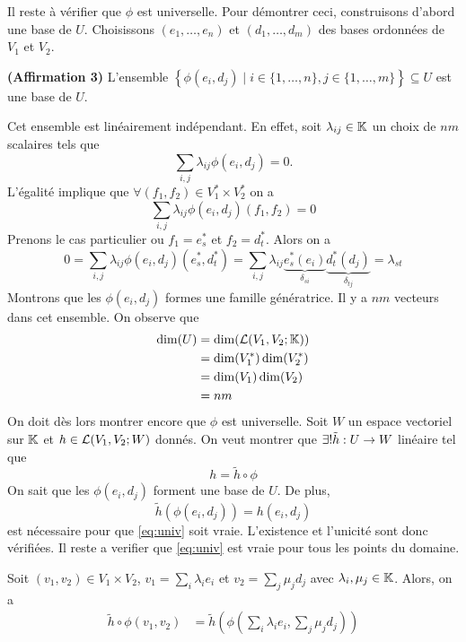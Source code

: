 \begin{theoreme}
\begin{preuve}
    Il reste à vérifier que $\phi$ est universelle. Pour démontrer ceci, construisons d'abord une base de $U$. Choisissons  $(e_1, \dots, e_n)$ et $(d_1, \dots, d_m)$ des bases ordonnées de $V_1$ et $V_2$.
    \par \textbf{(Affirmation 3)} L'ensemble $\left\{ \phi(e_i, d_j) \mid i \in \{1, \dots, n \}, j\in \{ 1, \dots, m\} \right\} \subseteq U$ est une base de $U$.
    \par Cet ensemble est linéairement indépendant. En effet, soit $\lambda_{ij} \in \mathbb{K}$ un choix de $nm$ scalaires tels que $$\sum_{i,j} \lambda_{ij} \phi(e_i, d_j) = 0.$$
    L'égalité implique que $\forall (f_1,f_2) \in V_1^* \times V_2^*$ on a
    $$\sum_{i,j} \lambda_{ij} \phi(e_i, d_j)(f_1,f_2) = 0$$
    Prenons le cas particulier ou $f_1 = e^*_s$ et $f_2 = d^*_t$. Alors on a
    $$0 = \sum_{i,j} \lambda_{ij} \phi(e_i, d_j)(e^*_s, d^*_t) = \sum_{i,j} \lambda_{ij} \underbrace{e^*_s(e_i)}_{\delta_{si}}\underbrace{d^*_t(d_j)}_{\delta_{tj}} = \lambda_{st}$$
    Montrons que les $\phi(e_i, d_j)$ formes une famille génératrice. Il y a $nm$ vecteurs dans cet ensemble. On observe que
    \begin{align*}
      \dim(U) &= \dim(\mathcal{L}(V_1,V_2;\mathbb{K})) \\
              &= \dim(V_1^*)\dim(V_2^*) \\
              &= \dim(V_1)\dim(V_2) \\
              &= nm
    \end{align*}
    On doit dès lors montrer encore que $\phi$ est universelle. Soit $W$ un espace vectoriel sur $\mathbb{K}$ et $h \in \mathcal{L}(V_1,V_2; W)$ donnés. On veut montrer que $\exists! \tilde{h}: U \rightarrow W$ linéaire tel que
    \begin{equation}\label{eq:univ}
      h = \tilde{h} \circ \phi \tag{$*$}
    \end{equation}
    On sait que les $\phi(e_i, d_j)$ forment une base de $U$. De plus,
    \begin{equation}\label{eq:univ_2}
      \tilde{h}(\phi(e_i, d_j)) = h(e_i, d_j) \tag{$**$}
    \end{equation}
    est nécessaire pour que \eqref{eq:univ} soit vraie. L'existence et l'unicité sont donc vérifiées. Il reste a verifier que \eqref{eq:univ} est vraie pour tous les points du domaine.
    \par Soit $(v_1,v_2) \in V_1\times V_2$, $v_1=\sum_i \lambda_i e_i$ et $v_2=\sum_j \mu_j d_j$ avec $\lambda_i, \mu_j \in \mathbb{K}$. Alors, on a
    \begin{align*}
      \tilde{h} \circ \phi(v_1,v_2) &= \tilde{h}\left( \phi\left( \sum_i \lambda_i e_i, \sum_j \mu_j d_j \right) \right) \\

\end{align*}
\end{preuve}
\end{theoreme}

